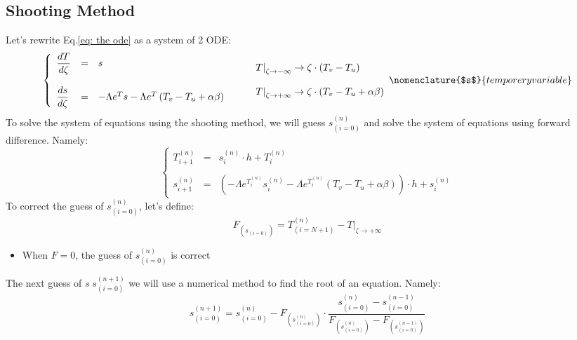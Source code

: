 \documentclass[11pt, a4paper]{article}
\begin{document}
\subsection{Shooting Method}
Let's rewrite Eq.\ref{eq: the ode} as a system of 2 ODE:
\begin{equation}
    \begin{matrix}
        \left\{\begin{array}{lcl}
            \displaystyle\frac{dT}{d\zeta} & = & s \\\\
            \displaystyle\frac{ds}{d\zeta} & = & -\Lambda e^Ts-\Lambda e^{T}\left(T_v-T_u+\alpha\beta\right)
        \end{array}\right. && \begin{array}{l}
            \left.T\right|_{\zeta\rightarrow-\infty}\rightarrow\zeta\cdot\left(T_v-T_u\right) \\\\
            \left.T\right|_{\zeta\rightarrow+\infty}\rightarrow\zeta\cdot\left(T_v-T_u+\alpha\beta\right)
        \end{array}
    \end{matrix}
    \nomenclature{$s$}{temporery variable}
\end{equation}
To solve the system of equations using the shooting method, we will guess $s_{(i=0)}^{(n)}$ and solve the system of equations using forward difference. Namely:
\begin{equation}
    \left\{\begin{array}{lcl}
        \displaystyle T_{i+1}^{(n)} & = & s_i^{(n)}\cdot h+T_i^{(n)} \\\\
        \displaystyle s_{i+1}^{(n)} & = & \left(-\Lambda e^{T_i^{(n)}}s_i^{(n)}-\Lambda e^{T_i^{(n)}}\left(T_v-T_u+\alpha\beta\right)\right)\cdot h+s_i^{(n)}
    \end{array}\right.
\end{equation}
To correct the guess of $s_{(i=0)}^{(n)}$, let's define:
\begin{equation}
    F_{\left(s_{(i=0)}\right)}=T^{(n)}_{(i=N+1)}-\left.T\right|_{\zeta\rightarrow+\infty}
\end{equation}
\begin{itemize}
    \item When $F=0$, the guess of $s_{(i=0)}^{(n)}$ is correct
\end{itemize}
The next guess of \emph{s} $s_{(i=0)}^{(n+1)}$ we will use a numerical method to find the root of an equation. Namely:
\begin{equation}
    s_{(i=0)}^{(n+1)}=s_{(i=0)}^{(n)}-F_{\left(s_{(i=0)}^{(n)}\right)}\cdot\frac{s_{(i=0)}^{(n)}-s_{(i=0)}^{(n-1)}}{F_{\left(s_{(i=0)}^{(n)}\right)}-F_{\left(s_{(i=0)}^{(n-1)}\right)}}
\end{equation}
\end{document}
